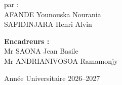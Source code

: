\begin{titlepage}
\vspace{0.8cm}

{\large par :}\\[4pt]
{\large AFANDE Younouska Nourania}\\[2pt]
{\large SAFIDINJARA Henri Alvin}

\vspace{0.9cm}

{\normalsize \textbf{Encadreurs :}}\\[3pt]
Mr SAONA Jean Basile\\[2pt]
Mr ANDRIANIVOSOA Ramamonjy

\vfill
{\large Année Universitaire 2026--2027}
\end{titlepage}

